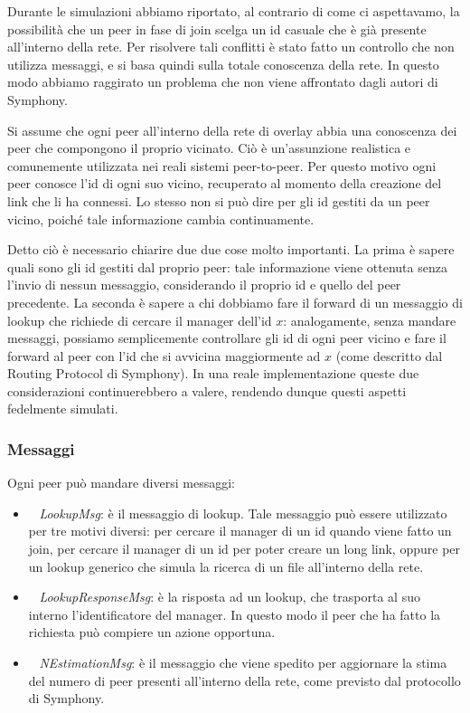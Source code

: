\documentclass[prodmode,acmtap]{acmlarge}
\begin{document}
Durante le simulazioni abbiamo riportato, al contrario di come ci aspettavamo, la possibilità che un peer in fase di join scelga un id casuale che è già presente all'interno della rete. Per risolvere tali conflitti è stato fatto un controllo che non utilizza messaggi, e si basa quindi sulla totale conoscenza della rete. In questo modo abbiamo raggirato un problema che non viene affrontato dagli autori di Symphony. 

Si assume che ogni peer all'interno della rete di overlay abbia una conoscenza dei peer che compongono il proprio vicinato. Ciò è un'assunzione realistica e comunemente utilizzata nei reali sistemi peer-to-peer. Per questo motivo ogni peer conosce l'id di ogni suo vicino, recuperato al momento della creazione del link che li ha connessi. Lo stesso non si può dire per gli id gestiti da un peer vicino, poiché tale informazione cambia continuamente. 

Detto ciò è necessario chiarire due due cose molto importanti. La prima è sapere quali sono gli id gestiti dal proprio peer: tale informazione viene ottenuta senza l'invio di nessun messaggio, considerando il proprio id e quello del peer precedente. La seconda è sapere a chi dobbiamo fare il forward di un messaggio di lookup che richiede di cercare il manager dell'id $x$: analogamente, senza mandare messaggi, possiamo semplicemente controllare gli id di ogni peer vicino e fare il forward al peer con l'id che si avvicina maggiormente ad $x$ (come descritto dal Routing Protocol di Symphony). In una reale implementazione queste due considerazioni continuerebbero a valere, rendendo dunque questi aspetti fedelmente simulati.

\subsubsection{Messaggi}

Ogni peer può mandare diversi messaggi:

\begin{itemize}
	\item ~ \textit{LookupMsg}: è il messaggio di lookup. Tale messaggio può essere utilizzato per tre motivi diversi: per cercare il manager di un id quando viene fatto un join, per cercare il manager di un id per poter creare un long link, oppure per un lookup generico che simula la ricerca di un file all'interno della rete.
	\item ~ \textit{LookupResponseMsg}: è la risposta ad un lookup, che trasporta al suo interno l'identificatore del manager. In questo modo il peer che ha fatto la richiesta può compiere un azione opportuna.
	\item ~ \textit{NEstimationMsg}: è il messaggio che viene spedito per aggiornare la stima del numero di peer presenti all'interno della rete, come previsto dal protocollo di Symphony.
\end{itemize}
\end{document}

